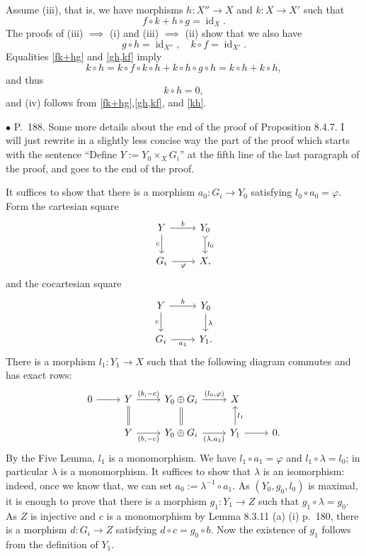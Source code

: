 \documentclass[12pt]{article}
\theoremstyle{remark}%
\newcommand{\bu}{\bullet}
\newcommand{\n}{\noindent}
\newcommand{\p}{\varphi}
\newcommand{\be}{\begin{equation}}
\newcommand{\ee}{\end{equation}}
\DeclareMathOperator{\id}{id}
\begin{document}
Assume (iii), that is, we have morphisms $h:X''\to X$ and $k:X\to X'$ such that 
\be\label{fk+hg} 
f\circ k+h\circ g=\id_X.
\ee 
The proofs of (iii) $\implies$ (i) and (iii) $\implies$ (ii) show that we also have 
\be\label{gh,kf} 
g\circ h=\id_{X''},\quad k\circ f=\id_{X'}.
\ee 
Equalities \eqref{fk+hg} and \eqref{gh,kf} imply 
$$
k\circ h=k\circ f\circ k\circ h+k\circ h\circ g\circ h=k\circ h+k\circ h,
$$ 
and thus 
\be\label{kh} 
k\circ h=0, 
\ee 
and (iv) follows from  \eqref{fk+hg},\eqref{gh,kf}, and \eqref{kh}. 


\n$\bu$ P.~188. Some more details about the end of the proof of Proposition 8.4.7. I will just rewrite in a slightly less concise way the part of the proof which starts with the sentence ``Define $Y:=Y_0\times_XG_i$'' at the fifth line of the last paragraph of the proof, and goes to the end of the proof. 

It suffices to show that there is a morphism $a_0:G_i\to Y_0$ satisfying $l_0\circ a_0=\p$. Form the cartesian square 
$$
\begin{tikzcd}
Y\ar{r}{b}\ar[swap]{d}{c}&Y_0\ar[tail]{d}{l_0}\\
G_i\ar[swap]{r}{\p}&X,
\end{tikzcd}
$$
and the cocartesian square 
$$
\begin{tikzcd}
Y\ar{r}{b}\ar[swap]{d}{c}&Y_0\ar{d}{\lambda}\\
G_i\ar[swap]{r}{a_1}&Y_1.
\end{tikzcd}
$$ 
There is a morphism $l_1:Y_1\to X$ such that the following diagram commutes and has exact rows: 
$$
\begin{tikzcd}
0\ar{r}&Y\ar[equal]{d}\ar{r}{(b,-c)}&Y_0\oplus G_i\ar[equal]{d}\ar{r}{(l_0,\p)}&X\\
&Y\ar{r}[swap]{(b,-c)}&Y_0\oplus G_i\ar{r}[swap]{(\lambda,a_1)}&Y_1\ar{r}\ar{u}[swap]{l_1}&0.
\end{tikzcd}
$$ 
By the Five Lemma, $l_1$ is a monomorphism. We have $l_1\circ a_1=\p$ and $l_1\circ\lambda=l_0$; in particular $\lambda$ is a monomorphism. It suffices to show that $\lambda$ is an isomorphism: indeed, once we know that, we can set $a_0:=\lambda^{-1}\circ a_1$. As $(Y_0,g_0,l_0)$ is maximal, it is enough to prove that there is a morphism $g_1:Y_1\to Z$ such that $g_1\circ\lambda=g_0$. As $Z$ is injective and $c$ is a monomorphism by Lemma 8.3.11 (a) (i) p.~180, there is a morphism $d:G_i\to Z$ satisfying $d\circ c=g_0\circ b$. Now the existence of $g_1$ follows from the definition of $Y_1$. 
\end{document}
